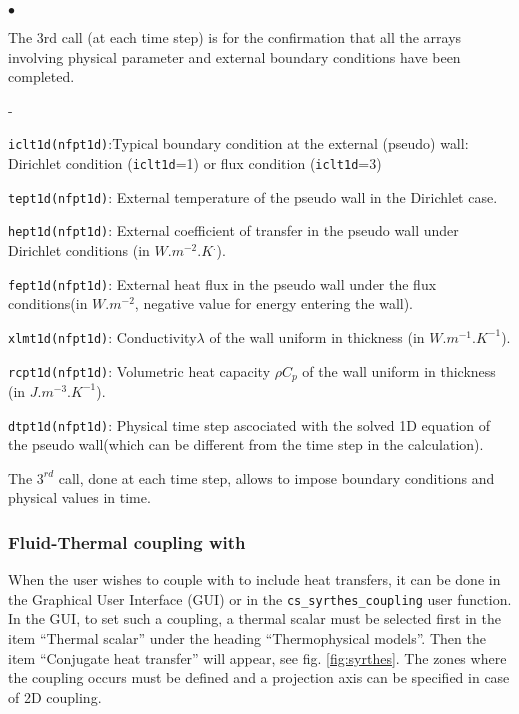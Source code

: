 {{{\begin{list}{$\bullet$}{}
\item The 3rd call (at each time step) is for the confirmation that all the arrays
 involving physical parameter and external boundary conditions have been completed.
\begin{list}{-}{}
\item \texttt{iclt1d(nfpt1d)}:Typical boundary condition at the external
 (pseudo) wall: Dirichlet condition (\texttt{iclt1d}=1) or flux condition (\texttt{iclt1d}=3)
\item \texttt{tept1d(nfpt1d)}: External temperature of the pseudo wall in the
 Dirichlet case.
\item \texttt{hept1d(nfpt1d)}: External coefficient of transfer in the pseudo
 wall under Dirichlet conditions (in $W.m^{-2}.K^.$).
\item \texttt{fept1d(nfpt1d)}: External heat flux in the pseudo wall under
 the flux conditions(in $W.m^{-2}$, negative value for energy entering the wall).
\item \texttt{xlmt1d(nfpt1d)}: Conductivity$\lambda$ of the wall uniform
in thickness (in $W.m^{-1}.K^{-1}$).
\item \texttt{rcpt1d(nfpt1d)}: Volumetric heat capacity $\rho C_p$ of the
wall uniform in thickness (in $J.m^{-3}.K^{-1}$).
\item \texttt{dtpt1d(nfpt1d)}: Physical time step ascociated with the solved
 1D equation of the pseudo wall(which can be different from the time step in the
 calculation).
\end{list}

\end{list}

The $3^{rd}$ call, done at each time step, allows to impose boundary conditions
 and physical values in time.

\subsubsection{Fluid-Thermal coupling with \syrthes}
When the user wishes to couple \CS with \syrthes to include heat transfers, it can be 
done in the Graphical User Interface (GUI) or in the
\texttt{cs\_syrthes\_coupling} user function.
In the GUI, to set such a coupling, a thermal scalar must be 
selected first in the item ``Thermal scalar'' under the heading ``Thermophysical models''.
 Then the item ``Conjugate heat transfer'' will appear, see fig. \ref{fig:syrthes}.
 The zones where the coupling occurs must be defined and a projection axis can be 
specified in case of 2D coupling.

}}}

